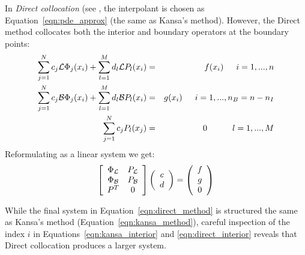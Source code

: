 \documentclass{report}
\begin{document}
{In \emph{Direct collocation} (see \cite{Larsson2003, Fedoseyev2002}, the interpolant is chosen as Equation~\ref{eqn:pde_approx} (the same as Kansa's method). However, the Direct method collocates both the interior and boundary operators at the boundary points:
\begin{eqnarray}
\sum_{j=1}^{N}c_j\mathcal{L}\Phi_j(x_i) + \sum_{l=1}^{M}d_l \mathcal{L}P_l(x_i) &=&f(x_i)  \hskip1.5em i = 1,...,n  \label{eqn:direct_interior} \\ 
\sum_{j=1}^{N}c_j\mathcal{B}\Phi_j(x_i) + \sum_{l=1}^{M}d_l \mathcal{B}P_l(x_i) &=& g(x_i)  \hskip1.5em i = 1,..., n_B=n-n_I \label{eqn:direct_boundary} \\
 \sum_{j=1}^{N} c_j P_l(x_j) &=& 0 \hskip3.0em l=1,...,M \label{eqn:direct_moments} 
\end{eqnarray}
Reformulating as a linear system we get: 
\begin{eqnarray}
\left[ \begin{array}{c c} 
	\Phi_{\mathcal{L}} & P_{\mathcal{L}} \\
	\Phi_{\mathcal{B}} & P_{\mathcal{B}} \\
	P^T  & 0 \\
	\end{array} \right] \left( \begin{array}{c}
							{c} \\
							{d}
							 \end{array}
						 \right) = \left( \begin{array}{c}
							{f} \\
							{g} \\
							0
							 \end{array}
						 \right) 
	\label{eqn:direct_method}
\end{eqnarray}

While the final system in Equation~\ref{eqn:direct_method} is structured the same as Kansa's method (Equation~\ref{eqn:kansa_method}), %
careful inspection of the index $i$ in Equations~\ref{eqn:kansa_interior} and \ref{eqn:direct_interior} reveals that Direct collocation produces a larger system. %


}
\end{document}
